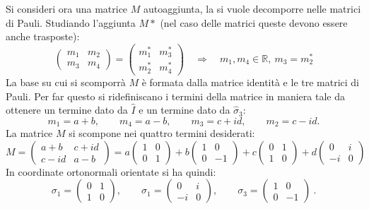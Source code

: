 Si consideri ora una matrice $M$ autoaggiunta, la si vuole decomporre nelle matrici di Pauli. Studiando l'aggiunta $M*$ (nel caso delle matrici queste devono essere anche trasposte):
\begin{equation*}
    \begin{pmatrix}
        m_1&m_2\\
        m_3&m_4
    \end{pmatrix}=\begin{pmatrix}
        m_1^*&m_3^*\\
        m_2^*&m_4^*
    \end{pmatrix}\quad\Longrightarrow\quad m_1,m_4\in\mathbb{R},\ m_3=m_2^*
\end{equation*}
La base su cui si scomporrà $M$ è formata dalla matrice identità e le tre matrici di Pauli. Per far questo si ridefiniscano i termini della matrice  in maniera tale da ottenere un termine dato da $\hat{I}$ e un termine dato da $\hat\sigma_3$:
\begin{equation*}
    m_1=a+b,\qquad m_4=a-b,\qquad m_3=c+id, \qquad m_2=c-id.
\end{equation*}
La matrice $M$ si scompone nei quattro termini desiderati:
\begin{equation*}
    M=\begin{pmatrix}
        a+b&c+id\\
        c-id&a-b
    \end{pmatrix}=a\begin{pmatrix}
        1&0\\
        0&1
    \end{pmatrix}+b\begin{pmatrix}
        1&0\\
        0&-1
    \end{pmatrix}+c\begin{pmatrix}
        0&1\\
        1&0
    \end{pmatrix}
    +d\begin{pmatrix}
        0&i\\
        -i&0
    \end{pmatrix}
\end{equation*}
In coordinate ortonormali orientate si ha quindi:
\begin{equation*}
    \boxed{
        \sigma_1=\begin{pmatrix}
            0&1\\
            1&0
        \end{pmatrix},\qquad
        \sigma_1=\begin{pmatrix}
            0&i\\
            -i&0
        \end{pmatrix},\qquad
        \sigma_3=\begin{pmatrix}
            1&0\\
            0&-1
        \end{pmatrix}
    }\ .
\end{equation*}
